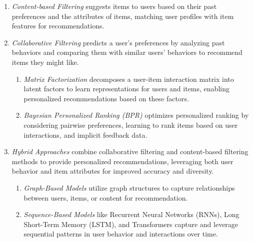 		\begin{enumerate}
			\item \textit{Content-based Filtering} suggests items to users based on their past preferences and the attributes of items, matching user profiles with item features for recommendations.
			\item \textit{Collaborative Filtering} predicts a user's preferences by analyzing past behaviors and comparing them with similar users' behaviors to recommend items they might like.
				\begin{enumerate}
					\item \textit{Matrix Factorization} decomposes a user-item interaction matrix into latent factors to learn representations for users and items, enabling personalized recommendations based on these factors.
					\item \textit{Bayesian Personalized Ranking (BPR)} optimizes personalized ranking by considering pairwise preferences, learning to rank items based on user interactions, and implicit feedback data.
				\end{enumerate}
			\item \textit{Hybrid Approaches} combine collaborative filtering and content-based filtering methods to provide personalized recommendations, leveraging both user behavior and item attributes for improved accuracy and diversity.
				\begin{enumerate}
					\item \textit{Graph-Based Models} utilize graph structures to capture relationships between users, items, or content for recommendation.
					\item \textit{Sequence-Based Models} like Recurrent Neural Networks (RNNs), Long Short-Term Memory (LSTM), and Transformers capture and leverage sequential patterns in user behavior and interactions over time.
				\end{enumerate}
		\end{enumerate}